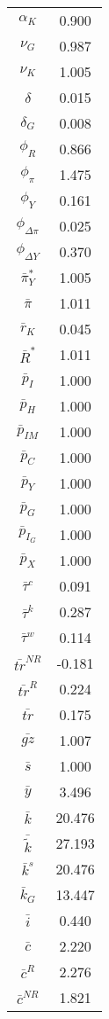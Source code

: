 \begin{center}
\begin{longtable}{cc}
$\alpha_K$ 	 & 	 0.900 \\
$\nu_G$ 	 & 	 0.987 \\
$\nu_K$ 	 & 	 1.005 \\
$\delta$ 	 & 	 0.015 \\
$\delta_G$ 	 & 	 0.008 \\
$\phi_R$ 	 & 	 0.866 \\
$\phi_{\pi}$ 	 & 	 1.475 \\
$\phi_Y$ 	 & 	 0.161 \\
$\phi_{\Delta\pi}$ 	 & 	 0.025 \\
$\phi_{\Delta Y}$ 	 & 	 0.370 \\
$\bar{\pi}_Y^*$ 	 & 	 1.005 \\
$\bar{\pi}$ 	 & 	 1.011 \\
$\bar{r}_K$ 	 & 	 0.045 \\
$\bar{R}^*$ 	 & 	 1.011 \\
$\bar{p}_I$ 	 & 	 1.000 \\
$\bar{p}_H$ 	 & 	 1.000 \\
$\bar{p}_{IM}$ 	 & 	 1.000 \\
$\bar{p}_C$ 	 & 	 1.000 \\
$\bar{p}_Y$ 	 & 	 1.000 \\
$\bar{p}_G$ 	 & 	 1.000 \\
$\bar{p}_{I_G}$ 	 & 	 1.000 \\
$\bar{p}_X$ 	 & 	 1.000 \\
$\bar{\tau}^c$ 	 & 	 0.091 \\
$\bar{\tau}^k$ 	 & 	 0.287 \\
$\bar{\tau}^w$ 	 & 	 0.114 \\
$\bar{tr}^{NR}$ 	 & 	 -0.181 \\
$\bar{tr}^{R}$ 	 & 	 0.224 \\
$\bar{tr}$ 	 & 	 0.175 \\
$\bar{gz}$ 	 & 	 1.007 \\
$\bar{s}$ 	 & 	 1.000 \\
$\bar{y}$ 	 & 	 3.496 \\
$\bar{k}$ 	 & 	 20.476 \\
$\bar{\tilde{k}}$ 	 & 	 27.193 \\
$\bar{k}^s$ 	 & 	 20.476 \\
$\bar{k}_G$ 	 & 	 13.447 \\
$\bar{i}$ 	 & 	 0.440 \\
$\bar{c}$ 	 & 	 2.220 \\
$\bar{c}^R$ 	 & 	 2.276 \\
$\bar{c}^{NR}$ 	 & 	 1.821 \\

\end{longtable}
\end{center}
